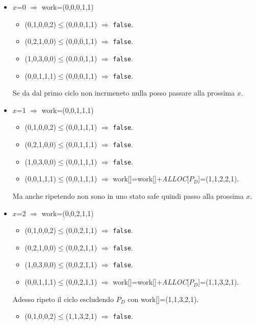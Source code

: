 \documentclass{article}
\begin{document}
    \begin{itemize}
        \item $x$=0 $\Rightarrow$ work=(0,0,0,1,1)
            \begin{itemize}
                \item (0,1,0,0,2)$\le$(0,0,0,1,1) $\Rightarrow$ \verb+false+.
                \item (0,2,1,0,0)$\le$(0,0,0,1,1) $\Rightarrow$ \verb+false+.
                \item (1,0,3,0,0)$\le$(0,0,0,1,1) $\Rightarrow$ \verb+false+.
                \item (0,0,1,1,1)$\le$(0,0,0,1,1) $\Rightarrow$ \verb+false+.
            \end{itemize}
            Se da dal primo ciclo non incrmeneto nulla posso passare alla prossima $x$.
        \item $x$=1 $\Rightarrow$ work=(0,0,1,1,1)
            \begin{itemize}
                \item (0,1,0,0,2)$\le$(0,0,1,1,1) $\Rightarrow$ \verb+false+.
                \item (0,2,1,0,0)$\le$(0,0,1,1,1) $\Rightarrow$ \verb+false+.
                \item (1,0,3,0,0)$\le$(0,0,1,1,1) $\Rightarrow$ \verb+false+.
                \item (0,0,1,1,1)$\le$(0,0,1,1,1) \checkmark $\Rightarrow$ work[]=work[]+\emph{ALLOC}[$P_D$]=(1,1,2,2,1).
            \end{itemize}
            Ma anche ripetendo non sono in uno stato safe quindi passo alla prossima $x$.
        \item $x$=2 $\Rightarrow$ work=(0,0,2,1,1)
        \begin{itemize}
            \item (0,1,0,0,2)$\le$(0,0,2,1,1) $\Rightarrow$ \verb+false+.
            \item (0,2,1,0,0)$\le$(0,0,2,1,1) $\Rightarrow$ \verb+false+.
            \item (1,0,3,0,0)$\le$(0,0,2,1,1) $\Rightarrow$ \verb+false+.
            \item (0,0,1,1,1)$\le$(0,0,2,1,1) \checkmark $\Rightarrow$ work[]=work[]+\emph{ALLOC}[$P_D$]=(1,1,3,2,1).
        \end{itemize}
        Adesso ripeto il ciclo escludendo $P_D$ con work[]=(1,1,3,2,1).
        \begin{itemize}
            \item (0,1,0,0,2)$\le$(1,1,3,2,1) $\Rightarrow$ \verb+false+.

\end{itemize}
\end{itemize}
\end{document}
